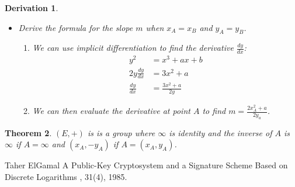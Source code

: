 \documentclass{article}%
\newtheorem{theorem}{Theorem}
\newtheorem{derivation}[theorem]{Derivation}
\begin{document}
\begin{derivation}
\begin{itemize}
\begin{enumerate}
$x_C=x_{C'}=m^2-x_A-x_B$

$y_C=-y_{C'}=-(m(x_C-x_A)+y_A)=-m(x_C-x_A)-y_A$.
\end{enumerate}

\item Derive the formula for the slope $m$ when $x_{A}=x_{B}$ and
$y_{A}=y_{B}$.

\begin{enumerate}
\item We can use implicit differentiation to find the derivative $\frac{dy}{dx}$:
\begin{align*}
    y^2&=x^3+ax+b\\
    2y\frac{dy}{dx} &= 3x^2+a\\
    \frac{dy}{dx} &= \frac{3x^2+a}{2y}
\end{align*}

\item We can then evaluate the derivative at point $A$ to find $m=\frac{2x_A^2+a}{2y_a}$.

\end{enumerate}
\end{itemize}
\end{derivation}

\begin{theorem}
$\left(  E,+\right)  $ is is a group where $\infty$ is identity and the
inverse of $A$ is $\infty$ if $A=\infty$ and $\left(  x_{A},-y_{A}\right)  $
if $A=\left(  x_{A},y_{A}\right)  $.
\end{theorem}
\begin{thebibliography}{}
Taher ElGamal
\newblock A Public-Key Cryptosystem and a Signature Scheme Based on Discrete Logarithms
, 31(4), 1985.
\end{thebibliography}
\end{document}
